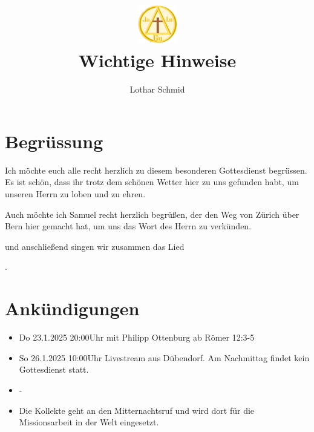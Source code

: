 \documentclass{../inc/mybib}
\title{\includegraphics[height=48pt]{../assets/images/logo.png}\\Wichtige Hinweise}
\author{Lothar Schmid}
\begin{document}
\maketitle
\section{Begrüssung}

Ich möchte euch alle recht herzlich zu diesem besonderen Gottesdienst begrüssen. Es ist schön, dass ihr trotz dem schönen Wetter hier zu uns gefunden habt, um unseren Herrn zu loben und zu ehren.

Auch möchte ich Samuel recht herzlich begrüßen, der den Weg von Zürich über Bern hier gemacht hat, um uns das Wort des Herrn zu verkünden. 

\noindent
\beten{} und anschließend singen wir zusammen das Lied

\noindent
{}.

\section{Ankündigungen}
\begin{itemize}
    \item {} Do 23.1.2025 20:00Uhr mit Philipp Ottenburg ab Römer 12:3-5
    \item {} So 26.1.2025 10:00Uhr Livestream aus Dübendorf. Am Nachmittag findet kein Gottesdienst statt.
    \item {} -
    \item {} Die Kollekte geht an den Mitternachtsruf und wird dort für die Missionsarbeit in der Welt eingesetzt.
\end{itemize}
\end{document}
